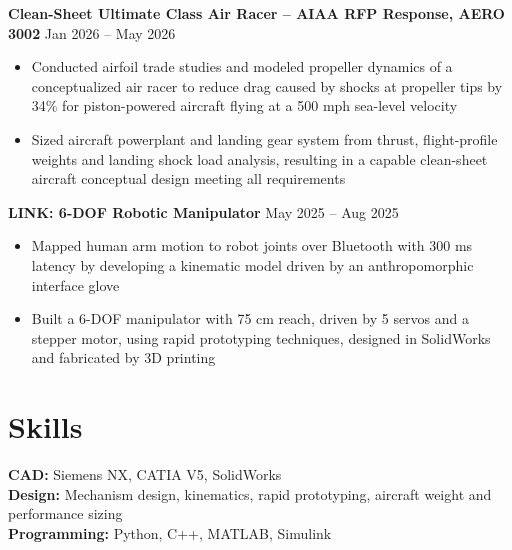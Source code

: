 \documentclass[11pt]{article}       %
\begin{document}
\textbf{Clean-Sheet Ultimate Class Air Racer -- AIAA RFP Response, AERO 3002} \hfill 
\textf Jan 2026 -- May 2026 \\
\vspace{-9pt}
\begin{itemize}
  \item Conducted airfoil trade studies and modeled propeller dynamics of a conceptualized air racer to reduce drag caused by shocks at propeller tips by 34\% for piston-powered aircraft flying at a 500 mph sea-level velocity
  \item Sized aircraft powerplant and landing gear system from thrust, flight-profile weights and landing shock load analysis, resulting in a capable clean-sheet aircraft conceptual design meeting all requirements
\end{itemize}
 
\textbf{LINK: 6-DOF Robotic Manipulator} 
\hfill \textf May 2025 -- Aug 2025 \\
\vspace{-9pt}
\begin{itemize}
  \item Mapped human arm motion to robot joints over Bluetooth with 300 ms latency by developing a kinematic model driven by an anthropomorphic interface glove
  \item Built a 6-DOF manipulator with 75 cm reach, driven by 5 servos and a stepper motor, using rapid prototyping techniques, designed in SolidWorks and fabricated by 3D printing 
\end{itemize}
 
\vspace{-14.5pt}
 
\section*{Skills}
\textbf{CAD:} Siemens NX, CATIA V5, SolidWorks \\
\textbf{Design:} Mechanism design, kinematics, rapid prototyping, aircraft weight and performance sizing \\
\textbf{Programming:} Python, C++, MATLAB, Simulink 
\end{document}
